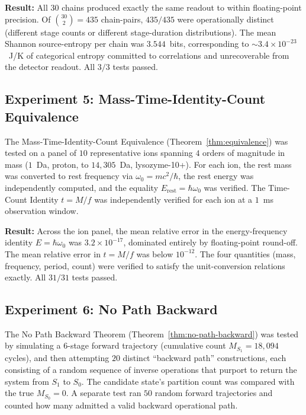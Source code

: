 \documentclass[twocolumn,10pt,a4paper]{article}
\theoremstyle{definition}
\theoremstyle{remark}
\begin{document}
\textbf{Result:} All $30$ chains produced exactly the same readout to within floating-point precision. Of $\binom{30}{2} = 435$ chain-pairs, $435/435$ were operationally distinct (different stage counts or different stage-duration distributions). The mean Shannon source-entropy per chain was $3.544$~bits, corresponding to $\sim 3.4 \times 10^{-23}$~J/K of categorical entropy committed to correlations and unrecoverable from the detector readout. All $3/3$ tests passed.



\subsection{Experiment 5: Mass-Time-Identity-Count Equivalence}
\label{sec:val-E5}

The Mass-Time-Identity-Count Equivalence (Theorem~\ref{thm:equivalence}) was tested on a panel of $10$ representative ions spanning $4$ orders of magnitude in mass ($1$~Da, proton, to $14{,}305$~Da, lysozyme-10+). For each ion, the rest mass was converted to rest frequency via $\omega_0 = mc^2/\hbar$, the rest energy was independently computed, and the equality $E_{\mathrm{rest}} = \hbar \omega_0$ was verified. The Time-Count Identity $t = M/f$ was independently verified for each ion at a $1$~ms observation window.

\textbf{Result:} Across the ion panel, the mean relative error in the energy-frequency identity $E = \hbar\omega_0$ was $3.2 \times 10^{-17}$, dominated entirely by floating-point round-off. The mean relative error in $t = M/f$ was below $10^{-12}$. The four quantities (mass, frequency, period, count) were verified to satisfy the unit-conversion relations exactly. All $31/31$ tests passed.



\subsection{Experiment 6: No Path Backward}
\label{sec:val-E6}

The No Path Backward Theorem (Theorem~\ref{thm:no-path-backward}) was tested by simulating a $6$-stage forward trajectory (cumulative count $M_{S_1} = 18{,}094$ cycles), and then attempting $20$ distinct ``backward path'' constructions, each consisting of a random sequence of inverse operations that purport to return the system from $S_1$ to $S_0$. The candidate state's partition count was compared with the true $M_{S_0} = 0$. A separate test ran $50$ random forward trajectories and counted how many admitted a valid backward operational path.
\end{document}
